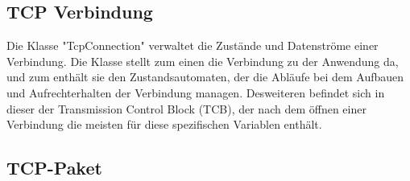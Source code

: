 \subsection{TCP Verbindung}
Die Klasse "{}TcpConnection"{} verwaltet die Zustände und Datenströme einer Verbindung. Die Klasse stellt zum einen die Verbindung zu der Anwendung da, und zum enthält sie den Zustandsautomaten, der die Abläufe bei dem Aufbauen und Aufrechterhalten der Verbindung managen. Desweiteren befindet sich in dieser der Transmission Control Block (TCB), der nach dem öffnen einer Verbindung die meisten für diese spezifischen Variablen enthält.   

\subsection{TCP-Paket}

